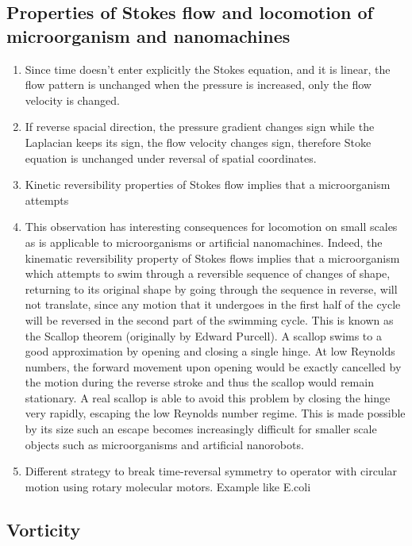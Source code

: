 \documentclass[12pt,a4paper]{article}
\begin{document}
        \subsection{Properties of Stokes flow and locomotion of microorganism and nanomachines}
            \begin{enumerate}
                \item Since time doesn't enter explicitly the Stokes equation, and it is linear, the flow pattern is unchanged when the pressure is increased, only the flow velocity is changed.
                \item If reverse spacial direction, the pressure gradient changes sign while the Laplacian keeps its sign, the flow velocity changes sign, therefore Stoke equation is unchanged under reversal of spatial coordinates.
                \item Kinetic reversibility properties of Stokes flow implies that a microorganism attempts
                \item This observation has interesting consequences for locomotion on small scales as is applicable to microorganisms or artificial nanomachines. 
                Indeed, the kinematic reversibility property of Stokes flows implies that a microorganism which attempts to swim through a reversible sequence of changes of shape, returning to its original shape by going through the sequence in reverse, will not translate, since any motion that it undergoes in the first half of the cycle will be reversed in the second part of the swimming cycle. 
                This is known as the Scallop theorem (originally by Edward Purcell). 
                A scallop swims to a good approximation by opening and closing a single hinge. 
                At low Reynolds numbers, the forward movement upon opening would be exactly cancelled by the motion during the reverse stroke and thus the scallop would remain stationary. 
                A real scallop is able to avoid this problem by closing the hinge very rapidly, escaping the low Reynolds number regime. 
                This is made possible by its size such an escape becomes increasingly difficult for smaller scale objects such as microorganisms and artificial nanorobots.
                \item Different strategy to break time-reversal symmetry to operator with circular motion using rotary molecular motors. Example like E.coli
            \end{enumerate}
        \subsection{Vorticity}
\end{document}
